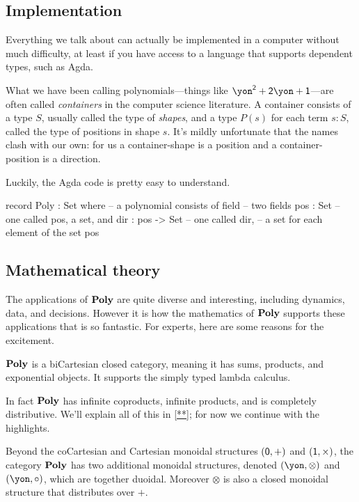 \documentclass[Book-Poly]{subfiles}
\begin{document}
\subsection{Implementation}

Everything we talk about can actually be implemented in a computer without much difficulty, at least if you have access to a language that supports dependent types, such as Agda.

What we have been calling polynomials---things like $\yon^\2+\2\yon+\1$---are often called \emph{containers} in the computer science literature. A container consists of a type $S$, usually called the type of \emph{shapes}, and a type $P(s)$ for each term $s:S$, called the type of positions in shape $s$. It's mildly unfortunate that the names clash with our own: for us a container-shape is a position and a container-position is a direction.

Luckily, the Agda code is pretty easy to understand.
\begin{agda}
record Poly : Set where  -- a polynomial consists of 
   field                      -- two fields
     pos : Set                -- one called pos, a set, and
     dir : pos -> Set         -- one called dir,
                              -- a set for each element of the set pos
\end{agda}  

\subsection{Mathematical theory}\label{subsec.math_theory}

The applications of $\textbf{Poly}$ are quite diverse and interesting, including dynamics, data, and decisions. However it is how the mathematics of $\textbf{Poly}$ supports these applications that is so fantastic. For experts, here are some reasons for the excitement.

\begin{proposition}
$\textbf{Poly}$ is a biCartesian closed category, meaning it has sums, products, and exponential objects. It supports the simply typed lambda calculus.
\end{proposition}

In fact $\textbf{Poly}$ has infinite coproducts, infinite products, and is completely distributive. We'll explain all of this in \cref{**}; for now we continue with the highlights.

\begin{proposition}
Beyond the coCartesian and Cartesian monoidal structures $(\textsf{0},+)$ and $(\textsf{1},\times)$, the category $\textbf{Poly}$ has two additional monoidal structures, denoted $(\yon,\otimes)$ and $(\yon,\circ)$, which are together duoidal. Moreover $\otimes$ is also a closed monoidal structure that distributes over $+$.
\end{proposition}
\end{document}
